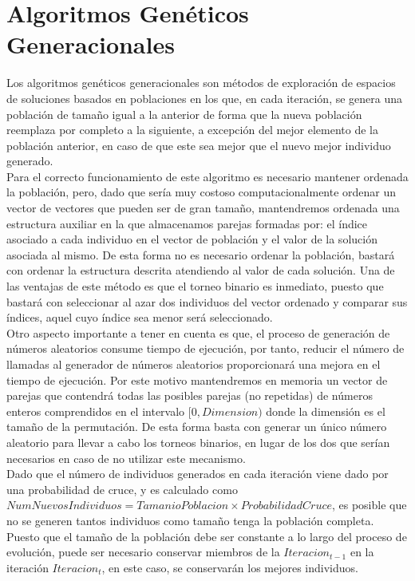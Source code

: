 \documentclass[11pt,a4paper]{article}
\begin{document}
\newpage
	
\section{Algoritmos Genéticos Generacionales}

	\noindent Los algoritmos genéticos generacionales son métodos de exploración de espacios de soluciones basados en poblaciones en los que, en cada iteración, se genera una población de tamaño igual a la anterior de forma que la nueva población reemplaza por completo a la siguiente, a excepción del mejor elemento de la población anterior, en caso de que este sea mejor que el nuevo mejor individuo generado.\\
	
	\noindent Para el correcto funcionamiento de este algoritmo es necesario mantener ordenada la población, pero, dado que sería muy costoso computacionalmente ordenar un vector de vectores que pueden ser de gran tamaño, mantendremos ordenada una estructura auxiliar en la que almacenamos parejas formadas por: el índice asociado a cada individuo en el vector de población y el valor de la solución asociada al mismo. De esta forma no es necesario ordenar la población, bastará con ordenar la estructura descrita atendiendo al valor de cada solución. Una de las ventajas de este método es que el torneo binario es inmediato, puesto que bastará con seleccionar al azar dos individuos del vector ordenado y comparar sus índices, aquel cuyo índice sea menor será seleccionado.\\
	
	\noindent Otro aspecto importante a tener en cuenta es que, el proceso de generación de números aleatorios consume tiempo de ejecución, por tanto, reducir el número de llamadas al generador de números aleatorios proporcionará una mejora en el tiempo de ejecución. Por este motivo mantendremos en memoria un vector de parejas que contendrá todas las posibles parejas (no repetidas) de números enteros comprendidos en el intervalo $[0,Dimension)$ donde la dimensión es el tamaño de la permutación. De esta forma basta con generar un único número aleatorio para llevar a cabo los torneos binarios, en lugar de los dos que serían necesarios en caso de no utilizar este mecanismo.\\
	
	\noindent Dado que el número de individuos generados en cada iteración viene dado por una probabilidad de cruce, y es calculado como $NumNuevosIndividuos = TamanioPoblacion \times ProbabilidadCruce$, es posible que no se generen tantos individuos como tamaño tenga la población completa. Puesto que el tamaño de la población debe ser constante a lo largo del proceso de evolución, puede ser necesario conservar miembros de la $Iteracion_{t-1}$ en la iteración $Iteracion_{t}$, en este caso, se conservarán los mejores individuos.\\
	
\end{document}
